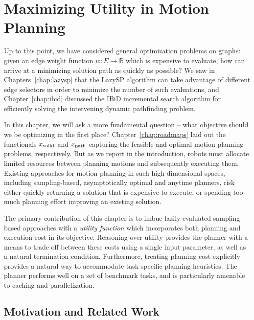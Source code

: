 \chapter{Maximizing Utility in Motion Planning}
\label{chap:utility}

Up to this point,
we have considered general optimization problems on graphs:
given an edge weight function $w : E \rightarrow \mathbb{R}$
which is expensive to evaluate,
how can arrive at a minimizing solution path as quickly as possible?
We saw in Chapters~\ref{chap:lazysp} that the LazySP algorithm
can take advantage of different edge selectors in order to minimize
the number of such evaluations,
and Chapter~\ref{chap:ibid} discussed the IBiD incremental search
algorithm for efficiently solving the intervening dynamic
pathfinding problem.

In this chapter,
we will ask a more fundamental question
-- what objective should we be optimizing in the first place?
Chapter~\ref{chap:roadmaps} laid out the functionals
$x_{\mbox{\scriptsize valid}}$ and $x_{\mbox{\scriptsize path}}$
capturing the feasible and optimal motion planning problems,
respectively.
But as we report in the introduction,
robots must allocate limited resources between planning
motions and subsequently executing them.
Existing approaches for motion planning in such high-dimensional
spaces,
including sampling-based, asymptotically optimal and anytime planners,
risk either quickly returning a solution that is expensive to execute,
or spending too much planning effort improving an existing solution.

The primary contribution of this chapter is to imbue 
lazily-evaluated sampling-based approaches
with a \emph{utility function}
which incorporates both planning and execution cost in its objective.
Reasoning over utility provides the planner
with a means to trade off between these costs using a single input
parameter,
as well as a natural termination condition.
Furthermore,
treating planning cost explicitly
provides a natural way to accommodate task-specific planning
heuristics.
The planner performs well on a set of benchmark tasks,
and is particularly amenable to caching
and parallelization.

\section{Motivation and Related Work}

